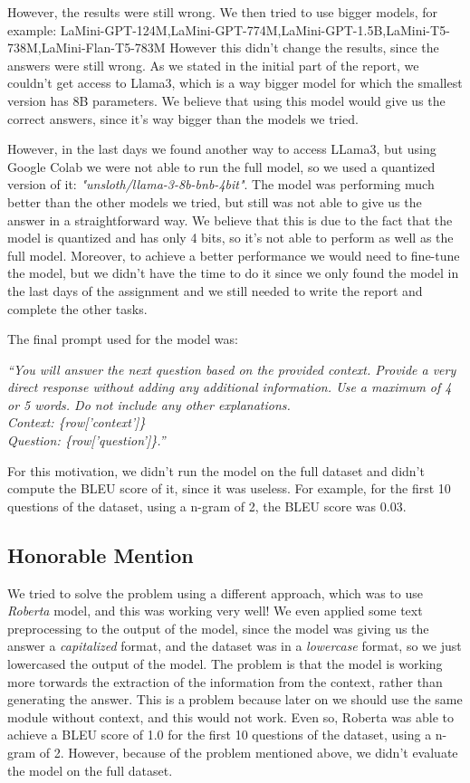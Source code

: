 \documentclass{Interspeech2024}
\begin{document}
However, the results were still wrong. We then tried to use
bigger models, for example: LaMini-GPT-124M,LaMini-GPT-774M,LaMini-GPT-1.5B,LaMini-T5-738M,LaMini-Flan-T5-783M
However this didn't change the results, since the answers were
still wrong. As we stated in the initial part of the report,
we couldn't get access to Llama3, which is a way bigger model for 
which the smallest version has 8B parameters. We believe that
using this model would give us the correct answers, since it's
way bigger than the models we tried.

However, in the last days we found another way to access LLama3, but 
using Google Colab we were not able to run the full model, so we used 
a quantized version of it: \textit{"unsloth/llama-3-8b-bnb-4bit"}.
The model was performing much better than the other models we tried,
but still was not able to give us the answer in a 
straightforward way. We believe that this is due to the fact that
the model is quantized and has only 4 bits, so it's not able to
perform as well as the full model. Moreover, to achieve 
a better performance we would need to fine-tune the model, but
we didn't have the time to do it since we only found the model
in the last days of the assignment and we still needed to
write the report and complete the other tasks.

The final prompt used for the model was:
\begin{center}
  
  \textit{``You will answer the next question based on the provided context. Provide a very direct response without adding any additional information. Use a maximum of 4 or 5 words. Do not include any other explanations. \\ 
  Context: \{row['context']\} \\ 
  Question: \{row['question']\}.''}
  
\end{center}
For this motivation, we didn't run the model on the full dataset and 
didn't compute the BLEU score of it, since it was useless. For example,
for the first 10 questions of the dataset, using a n-gram of 2, 
the BLEU score was 0.03.
\subsection{Honorable Mention}
We tried to solve the problem using a different approach,
which was to use \textit{Roberta} model, and this was working very well!
We even applied some text preprocessing to the output of the model, since
the model was giving us the answer a \textit{capitalized} format, 
and the dataset was in a \textit{lowercase} format, so we just 
lowercased the output of the model.
The problem is that the model is working more torwards the
extraction of the information from the context, rather than 
generating the answer. This is a problem because later on we should 
use the same module without context, and this would not work. 
Even so, Roberta was able to achieve a BLEU score of 1.0 for the first 10 questions of the dataset, using a n-gram of 2.
However, because of the problem mentioned above, we didn't evaluate the model on the full dataset.
\end{document}
